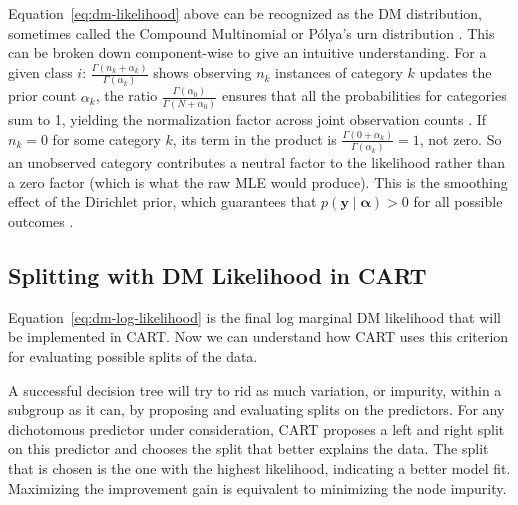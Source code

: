Equation~\ref{eq:dm-likelihood} above can be recognized as the DM distribution, sometimes called the Compound Multinomial or Pólya's urn distribution \citep{mimno_polya}. This can be broken down component-wise to give an intuitive understanding. For a given class \(i\): \( \frac{\Gamma(n_k + \alpha_k)}{\Gamma(\alpha_k)}\) shows observing \(n_k\) instances of category \(k\) updates the prior count \(\alpha_k\), the ratio \(\frac{\Gamma(\alpha_0)}{\Gamma(N + \alpha_0)}\) ensures that all the probabilities for categories sum to 1, yielding the normalization factor across joint observation counts \citep{gundersen2020dirichlet-multinomial, wiki:dirichlet-multinomial}. If \(n_k = 0\) for some category \(k\), its term in the product is \(\frac{\Gamma(0 + \alpha_k)}{\Gamma(\alpha_k)} = 1\), not zero. So an unobserved category contributes a neutral factor to the likelihood rather than a zero factor (which is what the raw MLE would produce). This is the smoothing effect of the Dirichlet prior, which guarantees that \(p(\mathbf{y} \mid \boldsymbol{\alpha}) > 0\) for all possible outcomes \citep{mimno_polya}. 


\subsection{Splitting with DM Likelihood in CART}
\label{sec:ch3-splits-in-cart}
Equation~\ref{eq:dm-log-likelihood} is the final log marginal DM likelihood that will be implemented in CART. Now we can understand how CART uses this criterion for evaluating possible splits of the data. 

A successful decision tree will try to rid as much variation, or impurity, within a subgroup as it can, by proposing and evaluating splits on the predictors. For any dichotomous predictor under consideration, CART proposes a left and right split on this predictor and chooses the split that better explains the data. The split that is chosen is the one with the highest likelihood, indicating a better model fit. Maximizing the improvement gain is equivalent to minimizing the node impurity.

